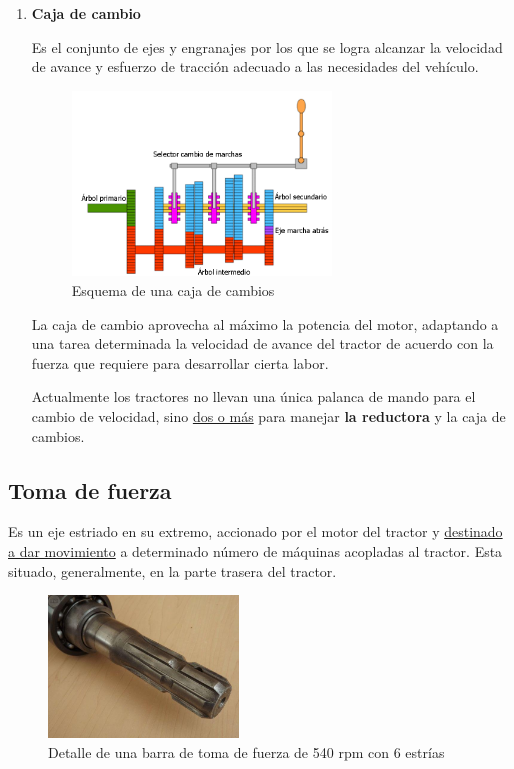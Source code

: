 \documentclass[a4paper,12pt,oneside]{book}
\begin{document}
\begin{enumerate}
\item \textbf{Caja de cambio}
\label{sec:org2815c7a}

Es el conjunto de ejes y engranajes por los que se logra alcanzar la velocidad
de avance y esfuerzo de tracción adecuado a las necesidades del vehículo.
\begin{figure}[htbp]
\centering
\includegraphics[width=0.65\textwidth]{./img_0009/caja_cambio.jpg}
\caption{Esquema de una caja de cambios}
\end{figure}

La caja de cambio aprovecha al máximo la potencia del motor, adaptando a una
tarea determinada la velocidad de avance del tractor de acuerdo con la fuerza
que requiere para desarrollar cierta labor.

Actualmente los tractores no llevan una única palanca de mando para el cambio de
velocidad, sino \uline{dos o más} para manejar \textbf{la reductora} y la caja de cambios.
\end{enumerate}

\subsection{Toma de fuerza}
\label{sec:org202f569}
Es un eje estriado en su extremo, accionado por el motor del tractor y
\uline{destinado a dar movimiento} a determinado número de máquinas acopladas al
tractor. Esta situado, generalmente, en la parte trasera del tractor.

\begin{figure}[htbp]
\centering
\includegraphics[width=0.45\textwidth]{./img_0009/toma_fuerza_2.jpg}
\caption{Detalle de una barra de toma de fuerza de 540 rpm con 6 estrías}
\end{figure}
\end{document}
